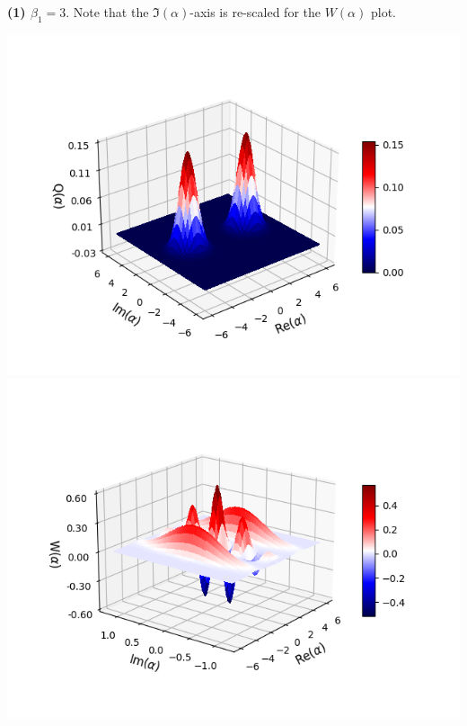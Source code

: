 \documentclass[11pt, oneside]{book}
\theoremstyle{break}
\theoremstyle{break}
\begin{document}
\textbf{(1) $\beta_1 = 3$}. Note that the $\Im(\alpha)$-axis is re-scaled for the $W(\alpha)$ plot. 
\begin{center}
\includegraphics[scale=0.8]{542HW4/b1Q}
\includegraphics[scale=0.8]{542HW4/b1W}
\end{center}
\newpage
\end{document}
